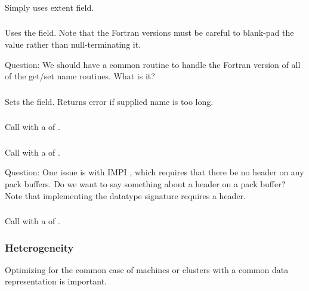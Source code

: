 \documentclass{article}
\begin{document}
\subsubsection{}
Simply uses extent field.

\subsubsection{}
Uses the  field.  Note that the Fortran versions must be careful to
blank-pad the value rather than null-terminating it.

Question: We should have a common routine to handle the Fortran version of all
of the get/set name routines.  What is it?

\subsubsection{}
Sets the  field.  Returns error if supplied name is too long.

\subsubsection{}
Call  with a  of .

\subsubsection{}
Call  with a  of .

Question: One issue is with IMPI \cite{impi}, which requires that there be no
header on any pack buffers.  Do we want to say something about a header on a
pack buffer?  Note that implementing the datatype signature
\cite{gro:mpi-datatypes:pvmmpi00} requires a header. 

\subsubsection{}
Call  with a  of .

\subsubsection{Heterogeneity}
\label{sec:hetero}
Optimizing for the common case of machines or clusters with a common
data representation is important.  
\end{document}
